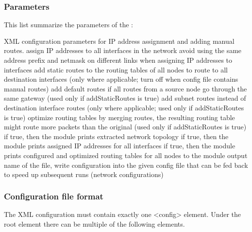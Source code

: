 \subsubsection*{Parameters}

This list summarize the parameters of the :

\begin{params}
   {XML configuration parameters for IP address assignment and adding manual routes.}
   {assign IP addresses to all interfaces in the network}
   {avoid using the same address prefix and
    netmask on different links when assigning IP addresses to interfaces}
   {add static routes to the routing tables of all nodes
    to route to all destination interfaces (only where applicable; turn off when
    config file contains manual routes)}
    {add default routes if all routes from a source node go
     through the same gateway (used only if addStaticRoutes is true)}
   {add subnet routes instead of destination interface routes
    (only where applicable; used only if addStaticRoutes is true)}
   {optimize routing tables by merging routes, the resulting routing table might
    route more packets than the original (used only if addStaticRoutes is true)}
   {if true, then the module prints extracted network topology}
   {if true, then the module prints assigned IP addresses for all interfaces}
   {if true, then the module prints configured and optimized routing tables for all nodes to
    the module output}
   {name of the file, write configuration into the given config file that can be fed back
    to speed up subsequent runs (network configurations)}
\end{params}

\subsubsection*{Configuration file format}

The XML configuration must contain exactly one <config> element. Under the
root element there can be multiple of the following elements.


